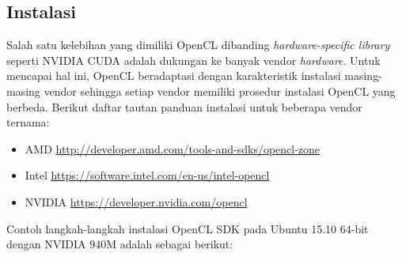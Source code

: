 \subsection{Instalasi}

Salah satu kelebihan yang dimiliki OpenCL dibanding \textit{hardware-specific library} seperti NVIDIA CUDA adalah dukungan ke banyak vendor \textit{hardware}. Untuk mencapai hal ini, OpenCL beradaptasi dengan karakteristik instalasi masing-masing vendor sehingga setiap vendor memiliki prosedur instalasi OpenCL yang berbeda. Berikut daftar tautan panduan instalasi untuk beberapa vendor ternama:

\begin{itemize}
	\item AMD \url{http://developer.amd.com/tools-and-sdks/opencl-zone​}
	\item Intel \url{https://software.intel.com/en-us/intel-opencl​}
	\item NVIDIA \url{https://developer.nvidia.com/opencl}
\end{itemize}

Contoh langkah-langkah instalasi OpenCL SDK pada Ubuntu 15.10 64-bit dengan NVIDIA 940M \cite{opencl.howto} adalah sebagai berikut:

